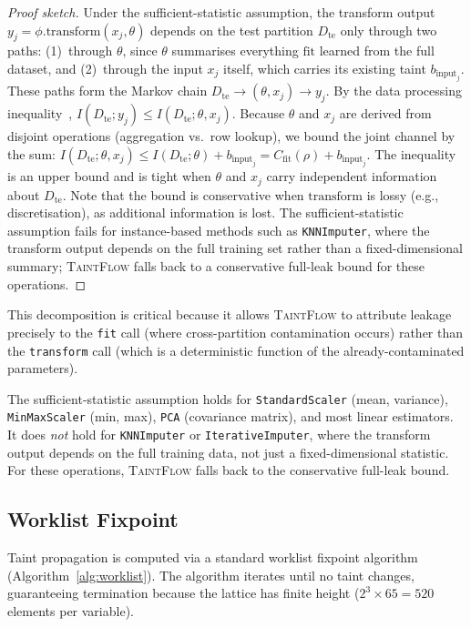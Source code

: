 \documentclass[11pt]{article}
\begin{document}
\begin{proof}[Proof sketch]
Under the sufficient-statistic assumption, the transform output
$y_j = \phi.\text{transform}(x_j, \theta)$ depends on the test
partition $D_{\text{te}}$ only through two paths:
(1)~through $\theta$, since $\theta$ summarises everything
$\text{fit}$ learned from the full dataset, and
(2)~through the input $x_j$ itself, which carries its existing taint
$b_{\text{input}_j}$.
These paths form the Markov chain
$D_{\text{te}} \to (\theta, x_j) \to y_j$.
By the data processing inequality~\cite{cover2006},
$I(D_{\text{te}}; y_j) \leq I(D_{\text{te}}; \theta, x_j)$.
Because $\theta$ and $x_j$ are derived from disjoint operations
(aggregation vs.\ row lookup), we bound the joint channel by the sum:
$I(D_{\text{te}}; \theta, x_j) \leq I(D_{\text{te}}; \theta) +
b_{\text{input}_j} = C_{\text{fit}}(\rho) + b_{\text{input}_j}$.
The inequality is an upper bound and is tight when $\theta$ and
$x_j$ carry independent information about $D_{\text{te}}$.
Note that the bound is conservative when $\text{transform}$ is lossy
(e.g., discretisation), as additional information is lost.
The sufficient-statistic assumption fails for instance-based methods
such as \texttt{KNNImputer}, where the transform output depends on the
full training set rather than a fixed-dimensional summary;
\textsc{TaintFlow} falls back to a conservative full-leak bound for
these operations.
\end{proof}

This decomposition is critical because it allows \textsc{TaintFlow} to
attribute leakage precisely to the \texttt{fit} call (where
cross-partition contamination occurs) rather than the
\texttt{transform} call (which is a deterministic function of the
already-contaminated parameters).

The sufficient-statistic assumption holds for \texttt{StandardScaler}
(mean, variance), \texttt{MinMaxScaler} (min, max), \texttt{PCA}
(covariance matrix), and most linear estimators.  It does \emph{not}
hold for \texttt{KNNImputer} or \texttt{IterativeImputer}, where the
transform output depends on the full training data, not just a
fixed-dimensional statistic.  For these operations, \textsc{TaintFlow}
falls back to the conservative full-leak bound.

\subsection{Worklist Fixpoint}

Taint propagation is computed via a standard worklist fixpoint
algorithm (Algorithm~\ref{alg:worklist}).  The algorithm iterates
until no taint changes, guaranteeing termination because the lattice
has finite height ($2^3 \times 65 = 520$ elements per variable).
\end{document}
